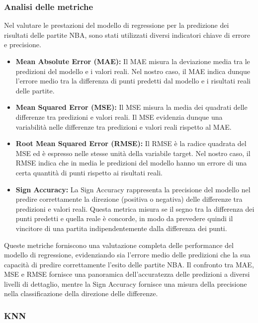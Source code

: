 \subsubsection{Analisi delle metriche}
Nel valutare le prestazioni del modello di regressione per la predizione dei risultati delle partite NBA, sono stati utilizzati diversi indicatori chiave di errore e precisione.

\begin{itemize}
    \item \textbf{Mean Absolute Error (MAE):} Il MAE misura la deviazione media tra le predizioni del modello e i valori reali. Nel nostro caso, il MAE indica dunque l'errore medio tra la differenza di punti predetti dal modello e i risultati reali delle partite.

    \item \textbf{Mean Squared Error (MSE):} Il MSE misura la media dei quadrati delle differenze tra predizioni e valori reali. Il MSE evidenzia dunque una variabilità nelle differenze tra predizioni e valori reali rispetto al MAE.

    \item \textbf{Root Mean Squared Error (RMSE):} Il RMSE è la radice quadrata del MSE ed è espresso nelle stesse unità della variabile target. Nel nostro caso, il RMSE indica che in media le predizioni del modello hanno un errore di una certa quantità di punti rispetto ai risultati reali.

    \item \textbf{Sign Accuracy:} La Sign Accuracy rappresenta la precisione del modello nel predire correttamente la direzione (positiva o negativa) delle differenze tra predizioni e valori reali. Questa metrica misura se il segno tra la differenza dei punti predetti e quella reale è concorde, in modo da prevedere quindi il vincitore di una partita indipendentemente dalla differenza dei punti.
\end{itemize}

Queste metriche forniscono una valutazione completa delle performance del modello di regressione, evidenziando sia l'errore medio delle predizioni che la sua capacità di predire correttamente l'esito delle partite NBA. Il confronto tra MAE, MSE e RMSE fornisce una panoramica dell'accuratezza delle predizioni a diversi livelli di dettaglio, mentre la Sign Accuracy fornisce una misura della precisione nella classificazione della direzione delle differenze.

\subsubsection{KNN}

